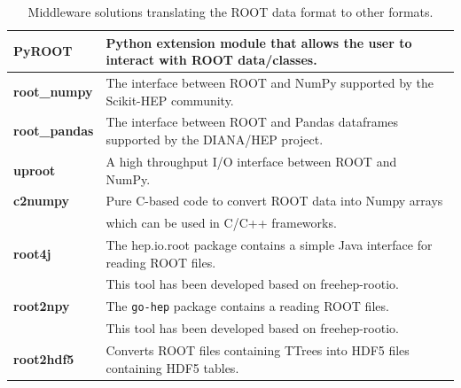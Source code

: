 \begin{table}[htbp]
 \caption{Middleware solutions translating the ROOT data format to other formats.}
 \begin{center}
  \begin{tabular}{|l|l|}
   \hline
   \textbf{PyROOT}       & Python extension module that allows the user to interact with ROOT data/classes.~\cite{PyROOT}          \\
   \hline
   \textbf{root\_numpy}  & The interface between ROOT and NumPy supported by the Scikit-HEP community.~\cite{root_numpy}           \\
   \hline
   \textbf{root\_pandas} & The interface between ROOT and Pandas dataframes supported by the DIANA/HEP project.~\cite{root_pandas} \\
   \hline
   \textbf{uproot}       & A high throughput I/O interface between ROOT and NumPy.~\cite{uproot}                                   \\
   \hline
   \textbf{c2numpy}      & Pure C-based code to convert ROOT data into Numpy arrays                                                \\
                         & which can be used in C/C++ frameworks.~\cite{c2numpy}                                                   \\
   \hline

   \textbf{root4j}       & The hep.io.root package contains a simple Java interface for reading ROOT files.                        \\
                         & This tool has been developed based on freehep-rootio.~\cite{root4j}                                     \\
   \hline

   \textbf{root2npy}     & The \texttt{go-hep} package contains a reading ROOT files.                                              \\
                         & This tool has been developed based on freehep-rootio.~\cite{root4j}                                     \\
   \hline

   \textbf{root2hdf5}    & Converts ROOT files containing TTrees into HDF5 files containing HDF5 tables.~\cite{root2hdf5}          \\
   \hline
  \end{tabular}
 \end{center}
 \label{table:Middleware}
\end{table}
\clearpage

